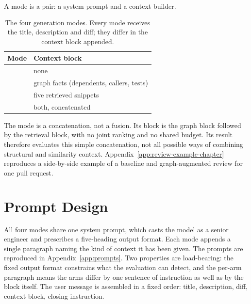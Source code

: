 A mode is a pair: a system prompt and a context builder.

\begin{table}[htbp]
    \centering
    \caption{The four generation modes. Every mode receives the title,
             description and diff; they differ in the context block appended.}
    \label{tab:modes}
    \small
    \begin{tabular}{@{}ll@{}}
        \toprule
        Mode & Context block \\
        \midrule
        \baseline{} & none \\
        \kg{}       & graph facts (dependents, callers, tests) \\
        \rag{}      & five retrieved snippets \\
        \hybrid{}   & both, concatenated \\
        \bottomrule
    \end{tabular}
\end{table}

The \hybrid{} mode is a concatenation, not a fusion. Its block is the graph
block followed by the retrieval block, with no joint ranking and no shared
budget. Its result therefore evaluates this simple concatenation, not all
possible ways of combining structural and similarity context.
Appendix~\ref{app:review-example-chapter} reproduces a side-by-side example
of a baseline and graph-augmented review for one pull request.

\section{Prompt Design}
\label{sec:approach-prompts}

All four modes share one system prompt, which casts the model as a senior
engineer and prescribes a five-heading output format. Each mode appends a
single paragraph naming the kind of context it has been given. The prompts are
reproduced in Appendix~\ref{app:prompts}. Two properties are load-bearing: the
fixed output format constrains what the evaluation can detect, and the per-arm
paragraph means the arms differ by one sentence of instruction as well as by
the block itself. The user message is assembled in a fixed order: title,
description, diff, context block, closing instruction.
